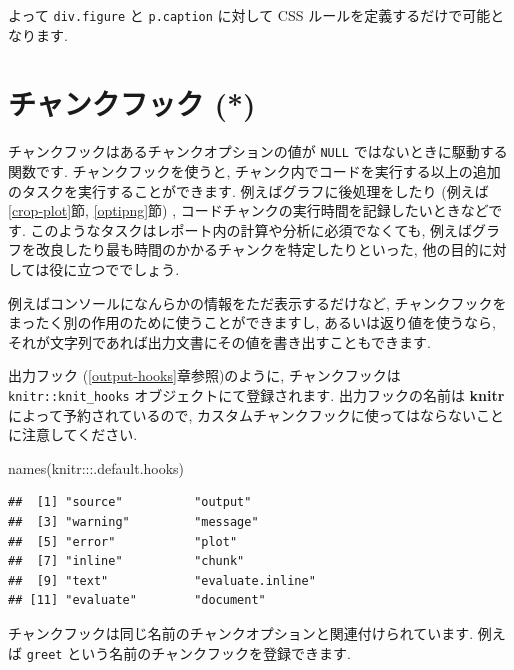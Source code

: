 \documentclass[
  11pt,
  lualatex,ja=standard,jafont=noto]{bxjsreport}
\newenvironment{Shaded}{\begin{snugshade}}{\end{snugshade}}
\newcommand{\FunctionTok}[1]{\textcolor[rgb]{0.00,0.00,0.00}{#1}}
\newcommand{\NormalTok}[1]{#1}
\newcommand{\SpecialCharTok}[1]{\textcolor[rgb]{0.00,0.00,0.00}{#1}}
\begin{document}
よって \texttt{div.figure} と \texttt{p.caption} に対して CSS ルールを定義するだけで可能となります.

\hypertarget{chunk-hooks}{%
\chapter{チャンクフック (*)}\label{chunk-hooks}}

チャンクフックはあるチャンクオプションの値が \texttt{NULL} ではないときに駆動する関数です. チャンクフックを使うと, チャンク内でコードを実行する以上の追加のタスクを実行することができます. 例えばグラフに後処理をしたり (例えば\ref{crop-plot}節, \ref{optipng}節) , コードチャンクの実行時間を記録したいときなどです. このようなタスクはレポート内の計算や分析に必須でなくても, 例えばグラフを改良したり最も時間のかかるチャンクを特定したりといった, 他の目的に対しては役に立つででしょう.

例えばコンソールになんらかの情報をただ表示するだけなど, チャンクフックをまったく別の作用のために使うことができますし, あるいは返り値を使うなら, それが文字列であれば出力文書にその値を書き出すこともできます.

出力フック (\ref{output-hooks}章参照)のように, チャンクフックは \texttt{knitr::knit\_hooks} オブジェクトにて登録されます. 出力フックの名前は \textbf{knitr} によって予約されているので, カスタムチャンクフックに使ってはならないことに注意してください.

\begin{Shaded}
\begin{Highlighting}[numbers=left,,]
\FunctionTok{names}\NormalTok{(knitr}\SpecialCharTok{:::}\NormalTok{.default.hooks)}
\end{Highlighting}
\end{Shaded}

\begin{verbatim}
##  [1] "source"          "output"         
##  [3] "warning"         "message"        
##  [5] "error"           "plot"           
##  [7] "inline"          "chunk"          
##  [9] "text"            "evaluate.inline"
## [11] "evaluate"        "document"
\end{verbatim}

チャンクフックは同じ名前のチャンクオプションと関連付けられています. 例えば \texttt{greet} という名前のチャンクフックを登録できます.
\end{document}
